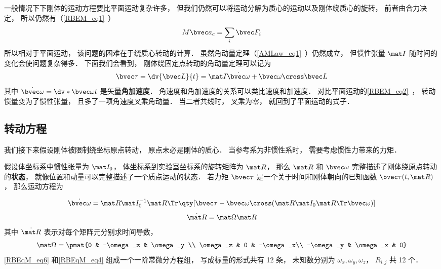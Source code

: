 

一般情况下下刚体的运动方程要比平面运动复杂许多， 但我们仍然可以将运动分解为质心的运动以及刚体绕质心的旋转， 前者由合力决定， 所以仍然有（\autoref{RBEM_eq1}~）
\begin{equation}\label{RBEqM_eq8}
M\bvec a_c = \sum_i \bvec F_i
\end{equation}
所以相对于平面运动， 该问题的困难在于绕质心转动的计算． 虽然角动量定理（\autoref{AMLaw_eq1}~）仍然成立， 但惯性张量 $\mat I$ 随时间的变化会使问题复杂得多． 下面我们会看到， 刚体绕固定点转动的角动量定理可以记为
\begin{equation}\label{RBEqM_eq1}
\bvec\tau = \dv{\bvec L}{t} = \mat I \dot{\bvec\omega} + \bvec\omega \cross \bvec L
\end{equation}
其中 $\dot{\bvec\omega} = \dv*{\bvec\omega}{t}$ 是矢量\textbf{角加速度}． 角速度和角加速度的关系可以类比速度和加速度． 对比平面运动的\autoref{RBEM_eq2}~， 转动惯量变为了惯性张量， 且多了一项角速度叉乘角动量． 当二者共线时， 叉乘为零， 就回到了平面运动的式子．

\subsection{转动方程}
我们接下来假设刚体被限制绕坐标原点转动， 原点未必是刚体的质心． 当参考系为非惯性系时， 需要考虑惯性力带来的力矩．

假设体坐标系中惯性张量为 $\mat I_0$， 体坐标系到实验室坐标系的旋转矩阵为 $\mat R$， 那么 $\mat R$ 和 $\bvec \omega$ 完整描述了刚体绕原点转动的\textbf{状态}， 就像位置和动量可以完整描述了一个质点运动的状态． 若力矩 $\bvec \tau$ 是一个关于时间和刚体朝向的已知函数 $\bvec \tau(t, \mat R)$， 那么运动方程为

\begin{equation}\label{RBEqM_eq6}
\dot{\bvec \omega} = \mat R \mat I_0^{-1} \mat R\Tr \qty[\bvec \tau  - \bvec\omega\cross(\mat R \mat I_0 \mat R\Tr \bvec\omega)]
\end{equation}
\begin{equation}\label{RBEqM_eq4}
\dot{\mat R} = \mat\Omega \mat R
\end{equation}
其中 $\dot{\mat R}$ 表示对每个矩阵元分别求时间导数，
\begin{equation}\label{RBEqM_eq5}
\mat\Omega = \pmat{0 & -\omega_z & \omega_y \\ \omega_z & 0 & -\omega_x\\ -\omega_y & \omega_x & 0}
\end{equation}
\autoref{RBEqM_eq6} 和\autoref{RBEqM_eq4} 组成一个一阶常微分方程组， 写成标量的形式共有 12 条， 未知数分别为 $\omega_x, \omega_y, \omega_z$， $R_{i,j}$ 共 12 个．

